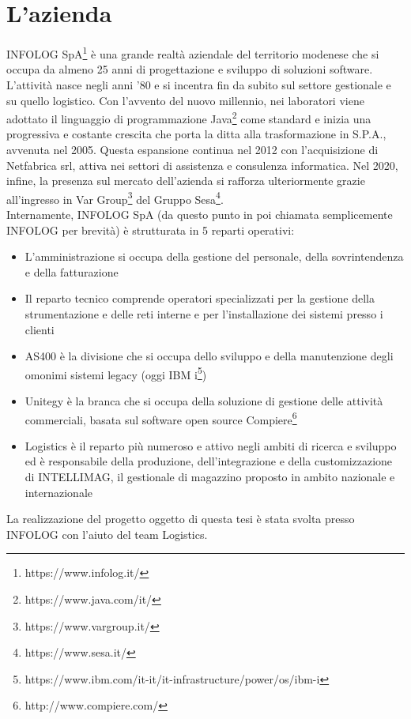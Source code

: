 \chapter{L'azienda}\label{c:company}

INFOLOG SpA\footnote{https://www.infolog.it/} è una grande realtà aziendale del territorio modenese che si occupa da almeno 25 anni di progettazione e sviluppo di soluzioni software.
L'attività nasce negli anni '80 e si incentra fin da subito sul settore gestionale e su quello logistico.
Con l'avvento del nuovo millennio, nei laboratori viene adottato il linguaggio di programmazione Java\footnote{https://www.java.com/it/} come standard e inizia una progressiva e 
costante crescita che porta la ditta alla trasformazione in S.P.A., avvenuta nel 2005.
Questa espansione continua nel 2012 con l'acquisizione di Netfabrica srl, attiva nei settori di assistenza e consulenza informatica.
Nel 2020, infine, la presenza sul mercato dell'azienda si rafforza ulteriormente grazie all'ingresso in Var Group\footnote{https://www.vargroup.it/} 
del Gruppo Sesa\footnote{https://www.sesa.it/}.
\\
Internamente, INFOLOG SpA (da questo punto in poi chiamata semplicemente INFOLOG per brevità) è strutturata in 5 reparti operativi:
\begin{itemize}
    \item L'amministrazione si occupa della gestione del personale, della sovrintendenza e della fatturazione
    \item Il reparto tecnico comprende operatori specializzati per la gestione della strumentazione e delle reti interne e per l'installazione dei sistemi presso i clienti
    \item AS400 è la divisione che si occupa dello sviluppo e della manutenzione degli omonimi sistemi legacy (oggi IBM i\footnote{https://www.ibm.com/it-it/it-infrastructure/power/os/ibm-i})
    \item Unitegy è la branca che si occupa della soluzione di gestione delle attività commerciali, basata sul software open source Compiere\footnote{http://www.compiere.com/}
    \item Logistics è il reparto più numeroso e attivo negli ambiti di ricerca e sviluppo ed è responsabile della produzione, dell'integrazione e della customizzazione di INTELLIMAG, 
    il gestionale di magazzino proposto in ambito nazionale e internazionale
\end{itemize}
La realizzazione del progetto oggetto di questa tesi è stata svolta presso INFOLOG con l'aiuto del team Logistics.